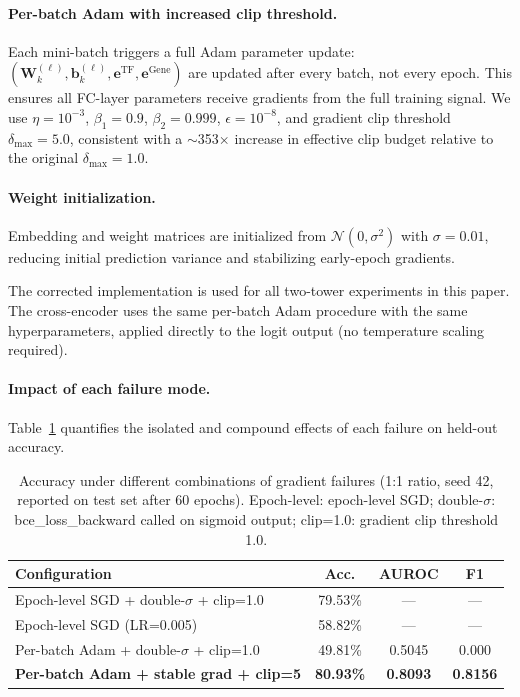 \documentclass[10pt,twocolumn]{article}
\begin{document}
\paragraph{Per-batch Adam with increased clip threshold.}
Each mini-batch triggers a full Adam parameter update:
$(\mathbf{W}^{(\ell)}_k, \mathbf{b}^{(\ell)}_k, \mathbf{e}^{\text{TF}}, \mathbf{e}^{\text{Gene}})$
are updated after every batch, not every epoch.
This ensures all FC-layer parameters receive gradients from the full training
signal.
We use $\eta = 10^{-3}$, $\beta_1 = 0.9$, $\beta_2 = 0.999$, $\epsilon = 10^{-8}$,
and gradient clip threshold $\delta_{\max} = 5.0$, consistent with a $\sim$353$\times$
increase in effective clip budget relative to the original $\delta_{\max} = 1.0$.

\paragraph{Weight initialization.}
Embedding and weight matrices are initialized from $\mathcal{N}(0, \sigma^2)$
with $\sigma = 0.01$, reducing initial prediction variance and stabilizing
early-epoch gradients.

The corrected implementation is used for all two-tower experiments in this paper.
The cross-encoder uses the same per-batch Adam procedure with the same hyperparameters,
applied directly to the logit output (no temperature scaling required).

\paragraph{Impact of each failure mode.}
Table~\ref{tab:failure_modes} quantifies the isolated and compound effects of
each failure on held-out accuracy.

\begin{table}[!htbp]
\centering
\caption{Accuracy under different combinations of gradient failures (1:1 ratio,
seed 42, reported on test set after 60 epochs). Epoch-level: epoch-level SGD;
double-$\sigma$: bce\_loss\_backward called on sigmoid output; clip=1.0: gradient
clip threshold 1.0.}
\label{tab:failure_modes}
\small
\begin{tabular}{@{}lccc@{}}
\toprule
\textbf{Configuration} & \textbf{Acc.} & \textbf{AUROC} & \textbf{F1} \\
\midrule
Epoch-level SGD + double-$\sigma$ + clip=1.0 & 79.53\% & --- & --- \\
Epoch-level SGD (LR=0.005) & 58.82\% & --- & --- \\
Per-batch Adam + double-$\sigma$ + clip=1.0 & 49.81\% & 0.5045 & 0.000 \\
\textbf{Per-batch Adam + stable grad + clip=5} & \textbf{80.93\%} & \textbf{0.8093} & \textbf{0.8156} \\
\bottomrule
\end{tabular}
\end{table}
\end{document}
